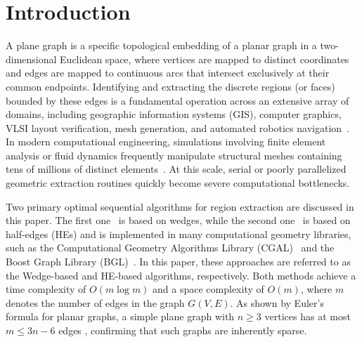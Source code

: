 \section{Introduction}

A plane graph is a specific topological embedding of a planar graph in a two-dimensional Euclidean space, where vertices are mapped to distinct coordinates and edges are mapped to continuous arcs that intersect exclusively at their common endpoints. Identifying and extracting the discrete regions (or faces) bounded by these edges is a fundamental operation across an extensive array of domains, including geographic information systems (GIS), computer graphics, VLSI layout verification, mesh generation, and automated robotics navigation~\cite{ANTOLIN2023103448,DEMAGALHAES2020102801,10.1145/3139958.3140001}. In modern computational engineering, simulations involving finite element analysis or fluid dynamics frequently manipulate structural meshes containing tens of millions of distinct elements~\cite{Lintermann2021,LINTERMANN2014131,electronics14153151}. At this scale, serial or poorly parallelized geometric extraction routines quickly become severe computational bottlenecks.


Two primary optimal sequential algorithms for region extraction are discussed in this paper. The first one~\cite{JIANG1993553} is based on wedges, while the second one~\cite{deberg2008computational} is based on half-edges (HEs) and is implemented in many computational geometry libraries, such as the Computational Geometry Algorithms Library (CGAL)~\cite{10.1145/1653771.1653865} and the Boost Graph Library (BGL)~\cite{10.5555/504206}. In this paper, these approaches are referred to as the Wedge-based and HE-based algorithms, respectively. Both methods achieve a time complexity of $O(m \log m)$ and a space complexity of $O(m)$, where $m$ denotes the number of edges in the graph $G(V, E)$. As shown by Euler's formula for planar graphs, a simple plane graph with $n \geq 3$ vertices has at most $m \leq 3n - 6$ edges \cite{Diestel2025}, confirming that such graphs are inherently sparse.

